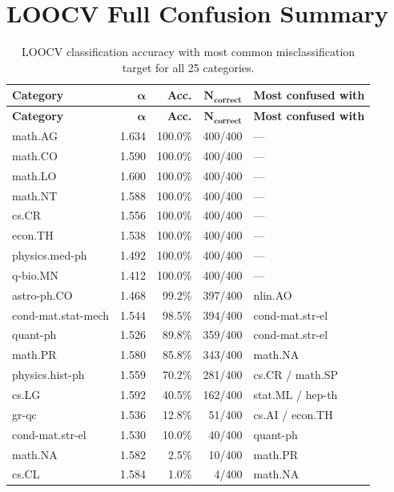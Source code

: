 \documentclass[11pt,letterpaper]{article}
\newcommand{\al}{\alpha}
\begin{document}
\section{LOOCV Full Confusion Summary}
\label{sec:loocv_full}

\begin{longtable}{lrrrl}
\caption{LOOCV classification accuracy with most common
misclassification target for all 25 categories.} \\
\toprule
\textbf{Category} & $\boldsymbol{\al}$ & \textbf{Acc.} &
$\boldsymbol{N_{\text{correct}}}$ & \textbf{Most confused with} \\
\midrule
\endfirsthead
\toprule
\textbf{Category} & $\boldsymbol{\al}$ & \textbf{Acc.} &
$\boldsymbol{N_{\text{correct}}}$ & \textbf{Most confused with} \\
\midrule
\endhead
math.AG & 1.634 & 100.0\% & 400/400 & --- \\
math.CO & 1.590 & 100.0\% & 400/400 & --- \\
math.LO & 1.600 & 100.0\% & 400/400 & --- \\
math.NT & 1.588 & 100.0\% & 400/400 & --- \\
cs.CR & 1.556 & 100.0\% & 400/400 & --- \\
econ.TH & 1.538 & 100.0\% & 400/400 & --- \\
physics.med-ph & 1.492 & 100.0\% & 400/400 & --- \\
q-bio.MN & 1.412 & 100.0\% & 400/400 & --- \\
astro-ph.CO & 1.468 & 99.2\% & 397/400 & nlin.AO \\
cond-mat.stat-mech & 1.544 & 98.5\% & 394/400 & cond-mat.str-el \\
quant-ph & 1.526 & 89.8\% & 359/400 & cond-mat.str-el \\
math.PR & 1.580 & 85.8\% & 343/400 & math.NA \\
physics.hist-ph & 1.559 & 70.2\% & 281/400 & cs.CR / math.SP \\
cs.LG & 1.592 & 40.5\% & 162/400 & stat.ML / hep-th \\
gr-qc & 1.536 & 12.8\% & 51/400 & cs.AI / econ.TH \\
cond-mat.str-el & 1.530 & 10.0\% & 40/400 & quant-ph \\
math.NA & 1.582 & 2.5\% & 10/400 & math.PR \\
cs.CL & 1.584 & 1.0\% & 4/400 & math.NA \\

\end{longtable}
\end{document}
